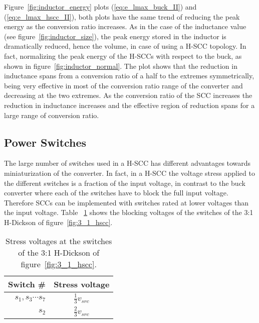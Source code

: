 Figure~\ref{fig:inductor_energy} plots (\ref{eq:e_lmax_buck_II}) and (\ref{eq:e_lmax_hscc_II}), both plots have the same trend of reducing the peak energy as the conversion ratio increases. As in the case of the inductance value (see figure~\ref{fig:inductor_size}), the peak energy stored in the inductor is dramatically reduced, hence the volume, in case of using a H-SCC topology. In fact, normalizing the peak energy of the H-SCCs with respect to the buck, as shown in figure~\ref{fig:inductor_normal}. The plot shows that the reduction in inductance spans from a conversion ratio of a half to the extremes symmetrically, being very effective in most of the conversion ratio range of the converter and decreasing at the two extremes. As the conversion ratio of the SCC increases the reduction in inductance increases and the effective region of reduction spans for a large range of conversion ratio.



\subsection{Power Switches}
The large number of switches used in a H-SCC has different advantages towards miniaturization of the converter. In fact, in a H-SCC the voltage stress applied to the different switches is a fraction of the input voltage, in contrast to the buck converter where each of the switches have to block the full input voltage. Therefore SCCs can be implemented with switches rated at lower voltages than the input voltage. Table ~\ref{tab:3:1 H-Dick_V_stress} shows the blocking voltages of the switches of the 3:1 H-Dickson of figure~\ref{fig:3_1_hscc}.

\begin{table}[h]
\centering
\caption{Stress voltages at the switches of the 3:1 H-Dickson of figure~\ref{fig:3_1_hscc}.}
\label{tab:3:1 H-Dick_V_stress}
\renewcommand{\arraystretch}{1.5}%
\begin{tabular}{r  c }
 Switch \# & Stress voltage  \\
 \midrule
 $s_1,s_3 \cdots s_7$ & $\frac{1}{3} v_{src}$ \\
 $s_2$ & $\frac{2 }{3} v_{src}$
\end{tabular}
\end{table}

